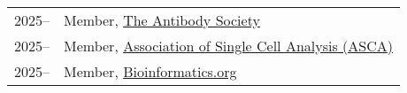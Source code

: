 \begin{longtable}[l]{@{}p{} p{}}

    2025-- & Member, \href{https://www.antibodysociety.org/}{The Antibody Society} \\

    2025-- & Member, \href{https://ascanet.org/}{Association of Single Cell Analysis (ASCA)} \\

    2025-- & Member, \href{https://www.bioinformatics.org/}{Bioinformatics.org} \\

\end{longtable}
